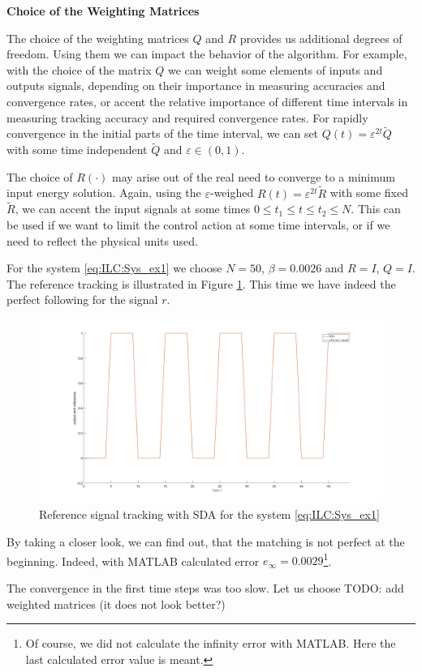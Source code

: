 \textbf{Choice of the Weighting Matrices}

The choice of the weighting matrices $Q$ and $R$ provides us additional degrees of freedom. 
Using them we can impact the behavior of the algorithm. For example, with the choice of the matrix $Q$ we can weight some elements of inputs and outputs signals, depending on their importance in measuring accuracies and convergence rates, or accent the relative importance of different time intervals in measuring tracking accuracy and required convergence rates. For rapidly convergence in the initial parts of the time interval, we can set $Q(t) = \varepsilon^{2t}\tilde{Q}$ with some time independent $\tilde{Q}$ and $\varepsilon \in (0,1)$. 

The choice of $R(\cdot)$ may arise out of the real need to converge to a minimum input energy solution. 
Again, using the $\varepsilon$-weighed $R(t) = \varepsilon^{2t}\tilde{R}$ with some fixed $\tilde{R}$, we can accent the input signals at some times $0\leq t_1 \leq t \leq t_2 \leq N$. This can be used if we want to limit the control action at some time intervals, or if we need to reflect the physical units used. 

\begin{exam}
	For the system \eqref{eq:ILC:Sys_ex1} we choose $N = 50$, $\beta = 0.0026$ and $R = I$, $Q = I$. The reference tracking is illustrated in Figure \ref{img:ILC:Ex1_SDA50}. This time we have indeed the perfect following for the signal $r$. 
	
	\begin{figure}[ht]
		\centering
	\includegraphics[width=\textwidth]{fig/Ex1_SDA50.jpg}
	\caption{Reference signal tracking with SDA for the system \eqref{eq:ILC:Sys_ex1}}
	\label{img:ILC:Ex1_SDA50}
\end{figure}
	
By taking a closer look, we can find out, that the matching is not perfect at the beginning. Indeed, with MATLAB calculated  error 
$e_{\infty} = 0.0029$\footnote{Of course, we did not calculate the infinity error with MATLAB. Here the last calculated error value is meant.}. 	

The convergence in the first time steps was too slow. Let us choose 
TODO: add weighted matrices (it does not look better?)

\end{exam}


